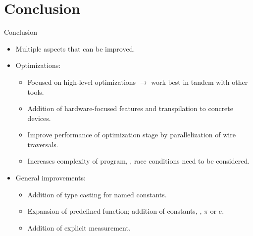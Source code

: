 
\section{Conclusion}
\begin{frame}{Conclusion}
    \begin{itemize}
        \item Multiple aspects that can be improved.
        \item Optimizations:
        \begin{itemize}
            \item Focused on high-level optimizations $\to$ work best in tandem with other tools.
            \item Addition of hardware-focused features and transpilation to concrete devices.
            \item Improve performance of optimization stage by parallelization of wire traversals.
            \item Increases complexity of program, \eg, race conditions need to be considered.
        \end{itemize}
        \item General improvements:
        \begin{itemize}
            \item Addition of type casting for named constants.
            \item Expansion of predefined function; addition of constants, \eg, $\pi$ or $e$.
            \item Addition of explicit measurement. 
        \end{itemize}
    \end{itemize}
\end{frame}